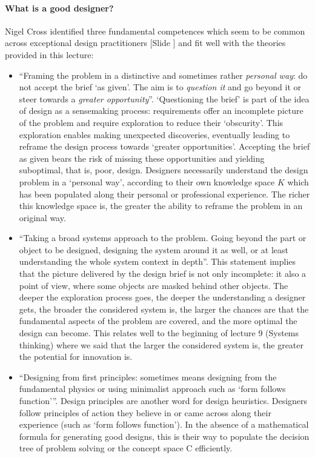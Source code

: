 \documentclass{article}
\newcounter{slide}
\begin{document}
\paragraph{What is a good designer?} Nigel Cross identified three fundamental competences which seem to be common across exceptional design practitioners {\color{blue}[Slide ]}\cite[reformulated by Elies Dekonkinck]{crossDesignThinkingUnderstanding2011a} and fit well with the theories provided in this lecture: 
\begin{itemize}
	\item ``Framing the problem in a distinctive and sometimes rather \emph{personal way}: do not accept the brief `as given'. The aim is to \emph{question it} and go beyond it or steer towards a \emph{greater opportunity}''. `Questioning the brief' is part of the idea of design as a sensemaking process: requirements offer an incomplete picture of the problem and require exploration to reduce their `obscurity'. This exploration enables making unexpected discoveries, eventually leading to reframe the design process towards `greater opportunities'. Accepting the brief as given bears the risk of missing these opportunities and yielding suboptimal, that is, poor, design. Designers necessarily understand the design problem in a `personal way', according to their own knowledge space $K$ which has been populated along their personal or professional experience. The richer this knowledge space is, the greater the ability to reframe the problem in an original way.
	\item ``Taking a broad systems approach to the problem. Going beyond the part or object to be designed, designing the system around it as well, or at least understanding the whole system context in depth''. This statement implies that the picture delivered by the design brief is not only incomplete: it also a point of view, where some objects are masked behind other objects. The deeper the exploration process goes, the deeper the understanding a designer gets, the broader the considered system is, the larger the chances are that the fundamental aspects of the problem are covered, and the more optimal the design can become. This relates well to the beginning of lecture 9 (Systems thinking) where we said that the larger the considered system is, the greater the potential for innovation is. 
	\item {\color{red}``Designing from first principles: sometimes means designing from the fundamental physics or using minimalist approach such as `form follows function'''}. Design principles are another word for design heuristics. Designers follow principles of action they believe in or came across along their experience (such as `form follows function'). In the absence of a mathematical formula for generating good designs, this is their way to populate the decision tree of problem solving or the concept space C efficiently. 
\end{itemize}
\end{document}
